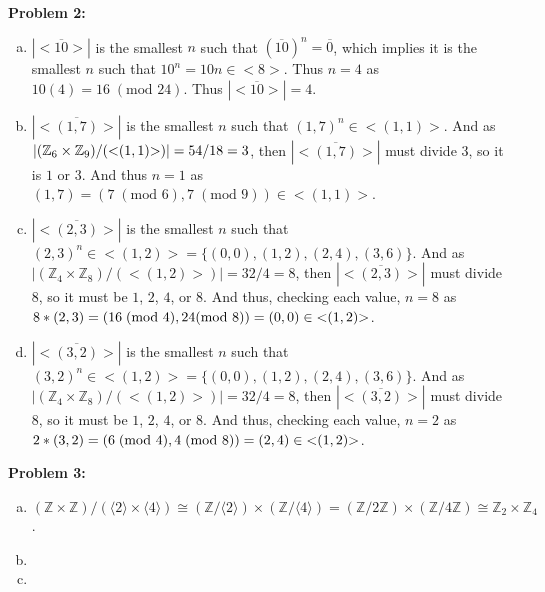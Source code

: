 \documentclass[12pt, letterpaper]{article}
\newenvironment{problem}
    [1]
    {\noindent \textbf{Problem #1:}}
    {\vspace{3mm}}
\begin{document}
\begin{problem}{2}
    \begin{enumerate}[(a)]
        \item $|{<}\overline{10}{>}|$ is the smallest $n$ such that $(\overline{10})^n = \overline{0}$,
        which implies it is the smallest $n$ such that $10^n = 10n \in {<}8{>}$. Thus 
        $n = 4$ as $10(4) = 16 \;(\text{mod } 24)$. Thus $|{<}\overline{10}{>}| = 4$.

        \item $|{<}\overline{(1,7)}{>}|$ is the smallest $n$ such that $(1,7)^n \in {<}(1,1){>}$.
        And as $|(\mathbb{Z}_6 \times \mathbb{Z}_9) / ({<}(1,1){>})| \\= 54/18 = 3$,
        then $|{<}\overline{(1,7)}{>}|$ must divide $3$, so it is $1$ or $3$. And thus
        $n = 1$ as $(1,7) = (7 \;(\text{mod } 6), 7 \;(\text{mod } 9)) \in {<}(1,1){>}$.

        \item $|{<}\overline{(2,3)}{>}|$ is the smallest $n$ such that $(2,3)^n \in {<}(1,2){>} = 
        \{(0,0), (1, 2), (2, 4), (3, 6)\}$. And as $|(\mathbb{Z}_4 \times \mathbb{Z}_8) / 
        ({<}(1,2){>})| = 32/4 = 8$, then $|{<}\overline{(2,3)}{>}|$ must divide $8$, 
        so it must be $1$, $2$, $4$, or $8$. And thus, checking each value, $n = 8$ as
        $8 * (2,3) = (16 \;(\text{mod } 4), 24 \;\\(\text{mod } 8)) = (0,0) \in {<}(1,2){>}$.

        \item $|{<}\overline{(3,2)}{>}|$ is the smallest $n$ such that $(3,2)^n \in {<}(1,2){>} = 
        \{(0,0), (1, 2), (2, 4), (3, 6)\}$. And as $|(\mathbb{Z}_4 \times \mathbb{Z}_8) / 
        ({<}(1,2){>})| = 32/4 = 8$, then $|{<}\overline{(3,2)}{>}|$ must divide $8$, 
        so it must be $1$, $2$, $4$, or $8$. And thus, checking each value, $n = 2$ as
        $2 * (3,2) = (6 \;(\text{mod } 4), 4 \;(\text{mod } 8))\\ = (2, 4) \in {<}(1,2){>}$.
        
    \end{enumerate}
\end{problem}

\begin{problem}{3}
    \begin{enumerate}[(a)]
        \item $(\mathbb{Z} \times \mathbb{Z}) / (\langle2\rangle \times \langle4\rangle) \cong 
        (\mathbb{Z} / \langle2\rangle) \times (\mathbb{Z} / \langle4\rangle) = (\mathbb{Z} / 
        2\mathbb{Z}) \times (\mathbb{Z} / 4\mathbb{Z}) \cong \mathbb{Z}_2 \times \mathbb{Z}_4$.

        \item 
        
        \item 
    \end{enumerate}
\end{problem}
\end{document}
